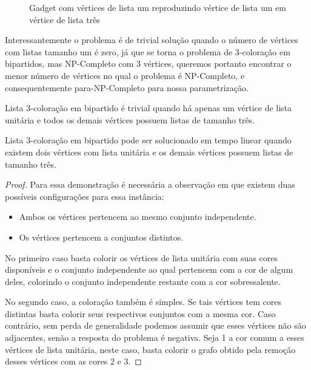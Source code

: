 \begin{figure}[H]
  \begin{subfigure}
    \centering
		
  \end{subfigure}
  \begin{subfigure}
    \centering
		
  \end{subfigure}
  \begin{subfigure}
    \centering
		
  \end{subfigure}
  \caption{Gadget com vértices de lista um reproduzindo vértice de lista um em vértice de lista três}
  \label{fig:gadget}
\end{figure}

Interessantemente o problema é de trivial solução quando o número de vértices com listas tamanho um é zero, já que se torna o problema de 3-coloração em bipartidos, mas NP-Completo com 3 vértices, queremos portanto encontrar o menor número de vértices no qual o problema é NP-Completo, e consequentemente para-NP-Completo para nossa parametrização.

Lista 3-coloração em bipartido é trivial quando há apenas um vértice de lista unitária e todos os demais vértices possuem listas de tamanho três.

\begin{teorema}
Lista 3-coloração em bipartido pode ser solucionado em tempo linear quando existem dois vértices com lista unitária e os demais vértices possuem listas de tamanho três.
\end{teorema}

\begin{proof}
Para essa demonstração é necessária a observação em que existem duas possíveis configurações para essa instância:

 \begin{itemize}
   \item Ambos os vértices pertencem ao mesmo conjunto independente.
   \item Os vértices pertencem a conjuntos distintos.
 \end{itemize} 

No primeiro caso basta colorir os vértices de lista unitária com suas cores disponíveis e o conjunto independente ao qual pertencem com a cor de algum deles, colorindo o conjunto independente restante com a cor sobressalente.
 
No segundo caso, a coloração também é simples. Se tais vértices tem cores distintas basta colorir seus respectivos conjuntos com a mesma cor. Caso contrário, sem perda de generalidade podemos assumir que esses vértices não são adjacentes, senão a resposta do problema é negativa. Seja 1 a cor comum a esses vértices de lista unitária, neste caso, basta colorir o grafo obtido pela remoção desses vértices com as cores 2 e 3.
\end{proof}

